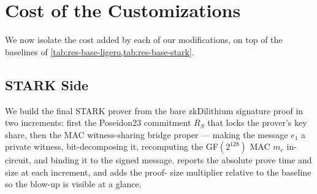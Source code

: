 \documentclass[binding=0.6cm,oneside,noexaminfo]{sapthesis}
\begin{document}


\section{Cost of the Customizations}
\label{results:customizations}
We now isolate the cost added by each of our modifications, on top of the
baselines of \cref{tab:res-base-ligero,tab:res-base-stark}.

\subsection{STARK Side}
\label{results:cust-stark}
We build the final STARK prover from the bare zkDilithium signature proof in two
increments: first the Poseidon23 commitment $R_S$ that locks the prover's key
share, then the MAC witness-sharing bridge proper --- making the message $e_1$ a
private witness, bit-decomposing it, recomputing the GF$(2^{128})$ MAC $m_e$
in-circuit, and binding it to the signed message. 
reports the absolute prove time and size at each increment, and adds the proof-
size multiplier relative to the baseline so the blow-up is visible at a glance.
\end{document}
